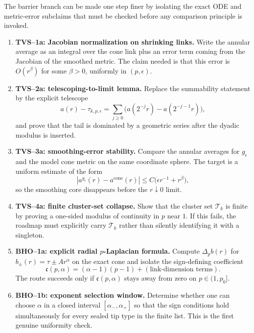\begin{remark}
\label{rem:TipNeckHyperatomicRoadmap}
The barrier branch can be made one step finer by isolating the exact ODE and
metric-error subclaims that must be checked before any comparison principle is
invoked.
\begin{enumerate}
    \item \textbf{TVS--1a: Jacobian normalization on shrinking links.}
    Write the annular average as an integral over the cone link plus an error
    term coming from the Jacobian of the smoothed metric.  The claim needed is
    that this error is \(O(r^\beta)\) for some \(\beta>0\), uniformly in
    \((p,\epsilon)\).

    \item \textbf{TVS--2a: telescoping-to-limit lemma.}
    Replace the summability statement by the explicit telescope
    \[
        a(r)-\tau_{k,p,\epsilon}
        =\sum_{j\ge0}\bigl(a(2^{-j}r)-a(2^{-j-1}r)\bigr),
    \]
    and prove that the tail is dominated by a geometric series after the
    dyadic modulus is inserted.

    \item \textbf{TVS--3a: smoothing-error stability.}
    Compare the annular averages for \(g_\epsilon\) and the model cone metric
    on the same coordinate sphere.  The target is a uniform estimate of the
    form
    \[
        |a^{g_\epsilon}(r)-a^{\mathrm{cone}}(r)|
        \le C\bigl(\epsilon r^{-1}+r^\beta\bigr),
    \]
    so the smoothing core disappears before the \(r\downarrow0\) limit.

    \item \textbf{TVS--4a: finite cluster-set collapse.}
    Show that the cluster set \(\mathcal T_k\) is finite by proving a
    one-sided modulus of continuity in \(p\) near \(1\).  If this fails, the
    roadmap must explicitly carry \(\mathcal T_k\) rather than silently
    identifying it with a singleton.

    \item \textbf{BHO--1a: explicit radial \(p\)-Laplacian formula.}
    Compute \(\Delta_p b(r)\) for \(b_\pm(r)=\tau\pm Ar^\alpha\) on the exact
    cone and isolate the sign-defining coefficient
    \[
        \mathfrak c(p,\alpha)
        =
        (\alpha-1)(p-1)+(\text{link-dimension terms}).
    \]
    The route succeeds only if \(\mathfrak c(p,\alpha)\) stays away from zero
    on \(p\in(1,p_0]\).

    \item \textbf{BHO--1b: exponent selection window.}
    Determine whether one can choose \(\alpha\) in a closed interval
    \([\alpha_-,\alpha_+]\) so that the sign conditions hold simultaneously
    for every sealed tip type in the finite list.  This is the first genuine
    uniformity check.


\end{enumerate}
\end{remark}
